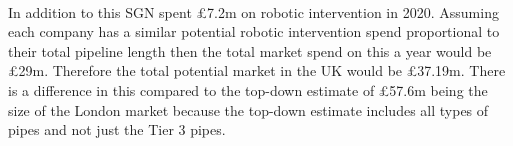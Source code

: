 \documentclass[11pt]{article}		%
\newcommand{\supercite}[1]{\textsuperscript{\cite{#1}}}		%
\begin{document}
		        In addition to this SGN spent £7.2m on robotic intervention in 2020.\supercite{SGN_Scotland}\supercite{SGN_Southern} Assuming each company has a similar potential robotic intervention spend proportional to their total pipeline length then the total market spend on this a year would be £29m. Therefore the total potential market in the UK would be £37.19m. There is a difference in this compared to the top-down estimate of £57.6m being the size of the London market because the top-down estimate includes all types of pipes and not just the Tier 3 pipes.    


    		        
    
\end{document}
